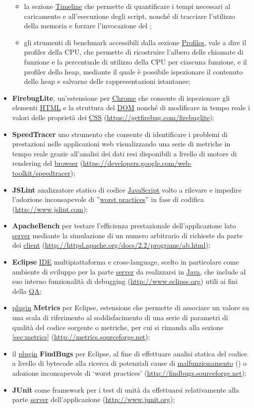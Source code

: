 \begin{itemize}
\begin{itemize}
   \item la sezione \underline{Timeline} che permette di quantificare i tempi necessari al caricamento e all'esecuzione degli script, nonché di tracciare l'utilizzo della memoria e forzare l'invocazione del ;
   \item  gli strumenti di benchmark accessibili dalla sezione \underline{Profiles}, vale a dire il profiler della CPU, che permette di ricostruire l'albero delle chiamate di funzione e la percentuale di utilizzo della CPU per ciascuna funzione, e il profiler dello heap, mediante il quale è possibile ispezionare il contenuto dello heap e salvarne delle rappresentazioni istantanee;
   \end{itemize}
  \item \textbf{FirebugLite}, un'estensione per \underline{Chrome} che consente di ispezionare gli elementi \underline{HTML} e la struttura del \underline{DOM} nonché di modificare in tempo reale i valori delle proprietà dei \underline{CSS} (\url{https://getfirebug.com/firebuglite});
  \item \textbf{SpeedTracer} uno strumento che consente di identificare i problemi di prestazioni nelle applicazioni web visualizzando una serie di metriche in tempo reale grazie all'analisi dei dati resi disponibili a livello di motore di rendering del \underline{browser} (\url{https://developers.google.com/web-toolkit/speedtracer});
  \item \textbf{JSLint} analizzatore statico di codice \underline{JavaScript} volto a rilevare e impedire l'adozione inconsapevole di ''\underline{worst practices}'' in fase di codifica (\url{http://www.jslint.com});
  \item \textbf{ApacheBench} per testare l'efficienza prestazionale dell'applicazione lato \underline{server} mediante la simulazione di un numero arbitrario di richieste da parte dei \underline{client} (\url{http://httpd.apache.org/docs/2.2/programs/ab.html});
  \item \textbf{Eclipse} \underline{IDE} multipiattaforma e cross-language, scelto in particolare come ambiente di sviluppo per la parte \underline{server} da realizzarsi in \underline{Java}, che include al suo interno funzionalità di debugging (\url{http://www.eclipse.org}) utili ai fini della \underline{QA};
  \item \underline{plugin} \textbf{Metrics} per Eclipse, estensione che permette di associare un valore su una scala di riferimento al soddisfacimento di una serie di parametri di qualità del codice sorgente o metriche, per cui si rimanda alla sezione \ref{sec:metrics} (\url{http://metrics.sourceforge.net});
  \item il \underline{plugin} \textbf{FindBugs} per Eclipse, al fine di effettuare analisi statica del codice a livello di bytecode alla ricerca di potenziali cause di \underline{malfunzionamento} () o adozione inconsapevole di `worst practices' (\url{http://findbugs.sourceforge.net});
  \item \textbf{JUnit} come framework per i test di unità da effettuarsi relativamente alla parte \underline{server} dell'applicazione (\url{http://www.junit.org});
\end{itemize}
